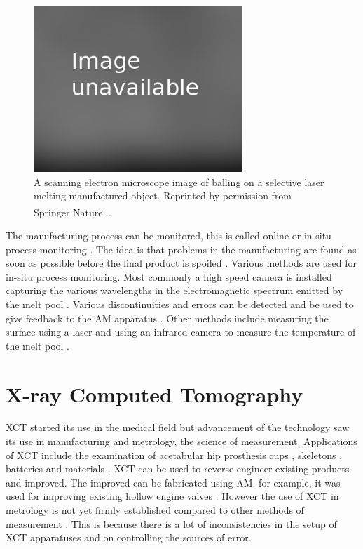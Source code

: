 \begin{figure}
  \centering
  \includegraphics[width=0.7\textwidth]{../figures/literatureReview/literature_balling.png}
  \caption{A scanning electron microscope image of balling on a selective laser melting manufactured object. Reprinted by permission from Springer Nature: \cite{li2012balling}\textsuperscript{\textcopyright}.}
  \label{fig:literature_balling}
\end{figure}

The manufacturing process can be monitored, this is called online or in-situ process monitoring \citep{everton2016review}. The idea is that problems in the manufacturing are found as soon as possible before the final product is spoiled \citep{cerniglia2015inspection}. Various methods are used for in-situ process monitoring. Most commonly a high speed camera is installed capturing the various wavelengths in the electromagnetic spectrum emitted by the melt pool \citep{berumen2010quality, craeghs2011online, lott2011design}. Various discontinuities and errors can be detected \citep{clijsters2014in} and be used to give feedback to the AM apparatus \citep{herzog2013method}. Other methods include measuring the surface using a laser \citep{cerniglia2015inspection} and using an infrared camera to measure the temperature of the melt pool \citep{rodriguez2012integration}. 

\section{X-ray Computed Tomography}

XCT started its use in the medical field but advancement of the technology saw its use in manufacturing and metrology, the science of measurement. Applications of XCT include the examination of acetabular hip prosthesis cups \citep{kourra2018computed}, skeletons \citep{appleby2014scoliosis}, batteries \citep{taiwo2017investigating} and materials \citep{zhang2016x, wang2017x}. XCT can be used to reverse engineer existing products and improved. The improved can be fabricated using AM, for example, it was used for improving existing hollow engine valves \citep{cooper2015design}. However the use of XCT in metrology is not yet firmly established compared to other methods of measurement \citep{thompson2016x}. This is because there is a lot of inconsistencies in the setup of XCT apparatuses and on controlling the sources of error.


